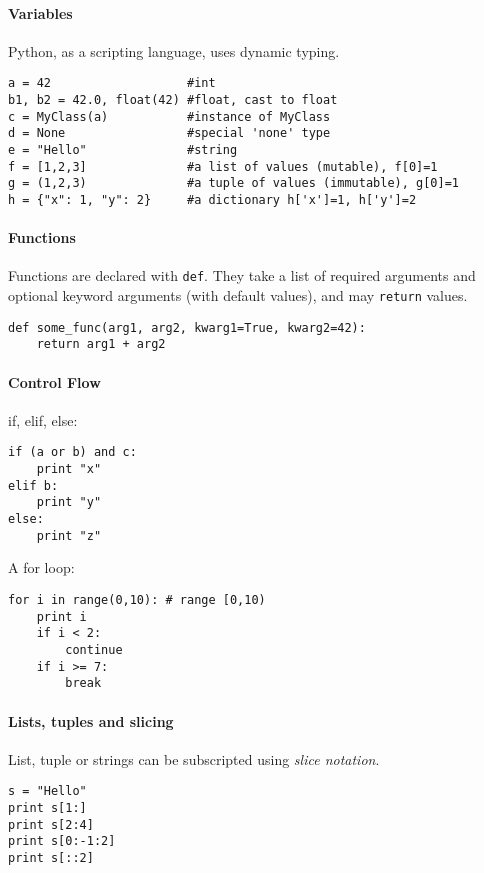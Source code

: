 \documentclass{../uebungsblatt}
\begin{document}
\paragraph{Variables}
Python, as a scripting language, uses dynamic typing.
\vspace*{-0.5em} \begin{lstlisting}
a = 42                   #int
b1, b2 = 42.0, float(42) #float, cast to float
c = MyClass(a)           #instance of MyClass
d = None                 #special 'none' type
e = "Hello"              #string
f = [1,2,3]              #a list of values (mutable), f[0]=1
g = (1,2,3)              #a tuple of values (immutable), g[0]=1
h = {"x": 1, "y": 2}     #a dictionary h['x']=1, h['y']=2
\end{lstlisting}\vspace*{-0.5em}

\paragraph{Functions}
Functions are declared with \lstinline!def!. They take a list of required
arguments and optional keyword arguments (with default values), and may \lstinline!return! values.
\vspace*{-0.5em} \begin{lstlisting}
def some_func(arg1, arg2, kwarg1=True, kwarg2=42):
    return arg1 + arg2
\end{lstlisting}\vspace*{-0.5em}

\paragraph{Control Flow}
if, elif, else:
\vspace*{-0.5em} \begin{lstlisting}
if (a or b) and c:
    print "x"
elif b:
    print "y"
else:
    print "z"
\end{lstlisting}\vspace*{-0.5em}
A for loop:
\vspace*{-0.5em} \begin{lstlisting}
for i in range(0,10): # range [0,10)
    print i
    if i < 2:
        continue
    if i >= 7:
        break
\end{lstlisting}\vspace*{-0.5em}

\paragraph{Lists, tuples and slicing}
List, tuple or strings can be subscripted using \emph{slice notation}.
\vspace*{-0.5em} \begin{lstlisting}
s = "Hello"
print s[1:]
print s[2:4]
print s[0:-1:2]
print s[::2]
\end{lstlisting}\vspace*{-0.5em}
\end{document}
